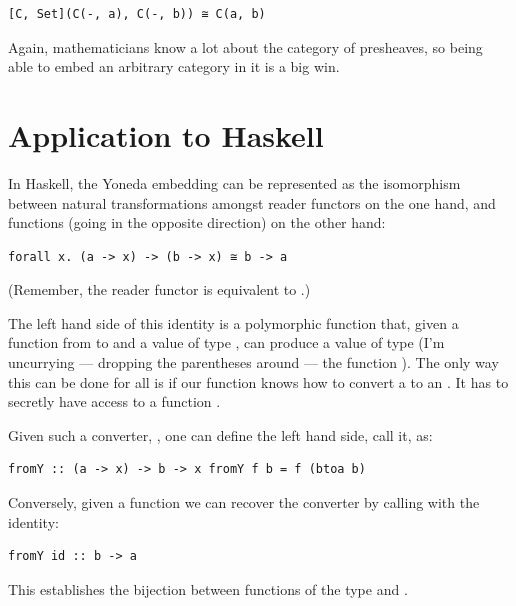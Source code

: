 \begin{Verbatim}[commandchars=\\\{\}]
[C, Set](C(-, a), C(-, b)) ≅ C(a, b)
\end{Verbatim}

Again, mathematicians know a lot about the category of presheaves, so
being able to embed an arbitrary category in it is a big win.

\section{Application to Haskell}\label{application-to-haskell}

In Haskell, the Yoneda embedding can be represented as the isomorphism
between natural transformations amongst reader functors on the one hand,
and functions (going in the opposite direction) on the other hand:

\begin{Verbatim}[commandchars=\\\{\}]
forall x. (a -> x) -> (b -> x) ≅ b -> a
\end{Verbatim}

(Remember, the reader functor is equivalent to
.)

The left hand side of this identity is a polymorphic function that,
given a function from  to  and a value of type
, can produce a value of type  (I'm uncurrying ---
dropping the parentheses around --- the function
). The only way this can be done for all
 is if our function knows how to convert a  to an
. It has to secretly have access to a function
.

Given such a converter, , one can define the left hand
side, call it, as:

\begin{Verbatim}[commandchars=\\\{\}]
fromY :: (a -> x) -> b -> x fromY f b = f (btoa b)
\end{Verbatim}

Conversely, given a function  we can recover the converter
by calling  with the identity:

\begin{Verbatim}[commandchars=\\\{\}]
fromY id :: b -> a
\end{Verbatim}

This establishes the bijection between functions of the type
 and .

